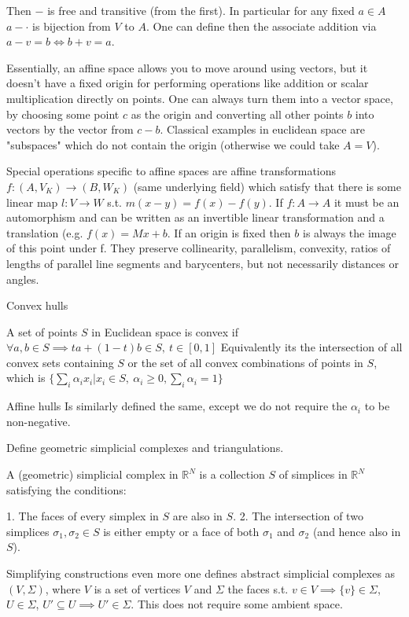 Then \( - \) is free and transitive (from the first). In particular for any fixed \( a \in A \)
\( a - \cdot \) is bijection from \( V \) to \( A \).
One can define then the associate addition via \( a - v = b \iff b + v = a \).

Essentially, an affine space allows you to move around using vectors, but it doesn't have a fixed origin for performing operations like addition or scalar multiplication directly on points.
One can always turn them into a vector space, by choosing some point \( c \) as the origin and converting all other points \( b \) into vectors by the vector from \( c - b \).
Classical examples in euclidean space are "subspaces" which do not contain the origin (otherwise we could take \( A = V \)).

Special operations specific to affine spaces are affine transformations \( f : (A, V_K) \to (B, W_K) \) (same underlying field)
which satisfy that there is some linear map \( l : V \to W \) s.t. \( m(x - y) = f(x) - f(y) \). If \( f : A \to A \) it must be an
automorphism and can be written as an invertible linear transformation and a translation (e.g. \( f(x) = Mx + b \).
If an origin is fixed then \( b \) is always the image of this point under f.
They preserve collinearity, parallelism, convexity, ratios of lengths of parallel line segments and barycenters,
but not necessarily distances or angles.

Convex hulls

A set of points \( S \) in Euclidean space is convex if \( \forall a, b \in S \implies ta + (1 - t)b \in S,\ t \in [0, 1] \)
Equivalently its the intersection of all convex sets containing \( S \) or the set of all convex combinations of points in \( S \),
which is \( \{ \sum_{i} \alpha_i x_i | x_i \in S,\ \alpha_i \geq 0, \sum_i \alpha_i = 1\} \)


Affine hulls
Is similarly defined the same, except we do not require the \( \alpha_i \) to be non-negative.

Define geometric simplicial complexes and triangulations. 

A (geometric) simplicial complex in \(\mathbb{R}^N\) is a collection \(S\) of simplices in \(\mathbb{R}^N\) satisfying the conditions:

1. The faces of every simplex in \(S\) are also in \(S\).
2. The intersection of two simplices \(\sigma_1, \sigma_2 \in S\) is either empty or a face of both \(\sigma_1\) and \(\sigma_2\)
(and hence also in \(S\)). 

Simplifying constructions even more one defines abstract simplicial complexes as \( (V, \Sigma) \), where \( V \) is a set of vertices \( V \)
and \( \Sigma \) the faces s.t. \( v \in V \implies \{v\} \in \Sigma \), \( U \in \Sigma \), \( U' \subseteq U \implies U' \in \Sigma \). This does not require some ambient space.

